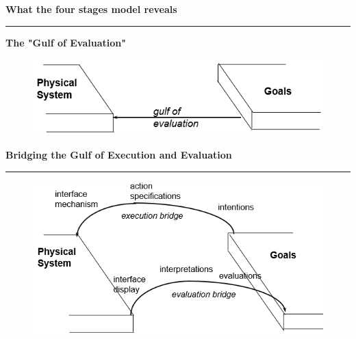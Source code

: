 \documentclass[pdf]{beamer}
\begin{document}
\begin{frame} 
\vspace{8mm}
\textcolor{myBlue}{\textbf{\Large{What the four stages model reveals}}}

\textcolor{red}{\rule{10cm}{1mm}}

\textbf{The "Gulf of Evaluation"}

\begin{figure} 
	\includegraphics[scale=0.7]{16_Picture1.png}
\end{figure}
\end{frame}




\begin{frame}
\vspace{8mm}
\textcolor{myBlue}{\textbf{\Large{Bridging the Gulf of Execution and Evaluation}}}

\textcolor{red}{\rule{10cm}{1mm}}

\begin{figure} 
\centering
\includegraphics[scale=0.72]{17_Picture1.png}
\end{figure}
\end{frame}
\end{document}
